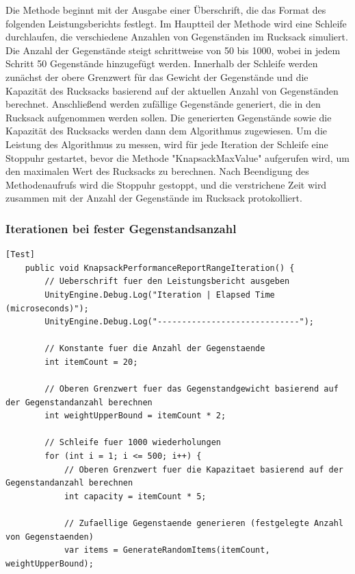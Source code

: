 \begin{itemize}
Die Methode beginnt mit der Ausgabe einer Überschrift, die das Format des folgenden Leistungsberichts festlegt. Im Hauptteil der Methode wird eine Schleife durchlaufen, die verschiedene Anzahlen von Gegenständen im Rucksack simuliert. Die Anzahl der Gegenstände steigt schrittweise von 50 bis 1000, wobei in jedem Schritt 50 Gegenstände hinzugefügt werden. Innerhalb der Schleife werden zunächst der obere Grenzwert für das Gewicht der Gegenstände und die Kapazität des Rucksacks basierend auf der aktuellen Anzahl von Gegenständen berechnet. Anschließend werden zufällige Gegenstände generiert, die in den Rucksack aufgenommen werden sollen. Die generierten Gegenstände sowie die Kapazität des Rucksacks werden dann dem Algorithmus zugewiesen.
Um die Leistung des Algorithmus zu messen, wird für jede Iteration der Schleife eine Stoppuhr gestartet, bevor die Methode "KnapsackMaxValue" aufgerufen wird, um den maximalen Wert des Rucksacks zu berechnen. Nach Beendigung des Methodenaufrufs wird die Stoppuhr gestoppt, und die verstrichene Zeit wird zusammen mit der Anzahl der Gegenstände im Rucksack protokolliert.

\subsubsection*{Iterationen bei fester Gegenstandsanzahl}

\begin{lstlisting}[style=csharp, caption={Codeabschnitt: Performance Messung bei 500 Aufrufen von 20 Gegenständen}, label={code:performanceIteration}]
    [Test]
    public void KnapsackPerformanceReportRangeIteration() {
        // Ueberschrift fuer den Leistungsbericht ausgeben
        UnityEngine.Debug.Log("Iteration | Elapsed Time (microseconds)");
        UnityEngine.Debug.Log("-----------------------------");

        // Konstante fuer die Anzahl der Gegenstaende
        int itemCount = 20;

        // Oberen Grenzwert fuer das Gegenstandgewicht basierend auf der Gegenstandanzahl berechnen
        int weightUpperBound = itemCount * 2;

        // Schleife fuer 1000 wiederholungen
        for (int i = 1; i <= 500; i++) {
            // Oberen Grenzwert fuer die Kapazitaet basierend auf der Gegenstandanzahl berechnen
            int capacity = itemCount * 5;

            // Zufaellige Gegenstaende generieren (festgelegte Anzahl von Gegenstaenden)
            var items = GenerateRandomItems(itemCount, weightUpperBound);


\end{lstlisting}
\end{itemize}
